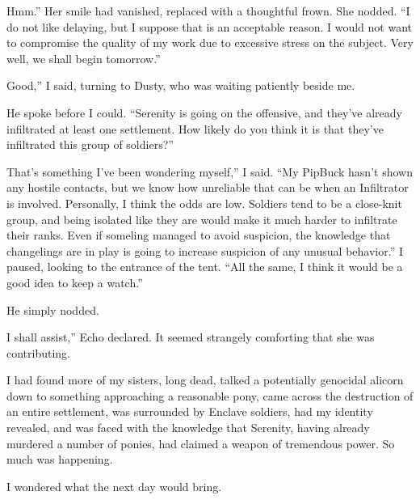 \leavevmode{}Hmm.” Her smile had vanished, replaced with a thoughtful frown. She nodded. “I do not like delaying, but I suppose that is an acceptable reason. I would not want to compromise the quality of my work due to excessive stress on the subject. Very well, we shall begin tomorrow.”

\leavevmode{}Good,” I said, turning to Dusty, who was waiting patiently beside me.

He spoke before I could. “Serenity is going on the offensive, and they’ve already infiltrated at least one settlement. How likely do you think it is that they’ve infiltrated this group of soldiers?”

\leavevmode{}That’s something I’ve been wondering myself,” I said. “My PipBuck hasn’t shown any hostile contacts, but we know how unreliable that can be when an Infiltrator is involved. Personally, I think the odds are low. Soldiers tend to be a close-knit group, and being isolated like they are would make it much harder to infiltrate their ranks. Even if someling managed to avoid suspicion, the knowledge that changelings are in play is going to increase suspicion of any unusual behavior.” I paused, looking to the entrance of the tent. “All the same, I think it would be a good idea to keep a watch.”

He simply nodded.

\leavevmode{}I shall assist,” Echo declared. It seemed strangely comforting that she was contributing.

I had found more of my sisters, long dead, talked a potentially genocidal alicorn down to something approaching a reasonable pony, came across the destruction of an entire settlement, was surrounded by Enclave soldiers, had my identity revealed, and was faced with the knowledge that Serenity, having already murdered a number of ponies, had claimed a weapon of tremendous power. So much was happening.

I wondered what the next day would bring.